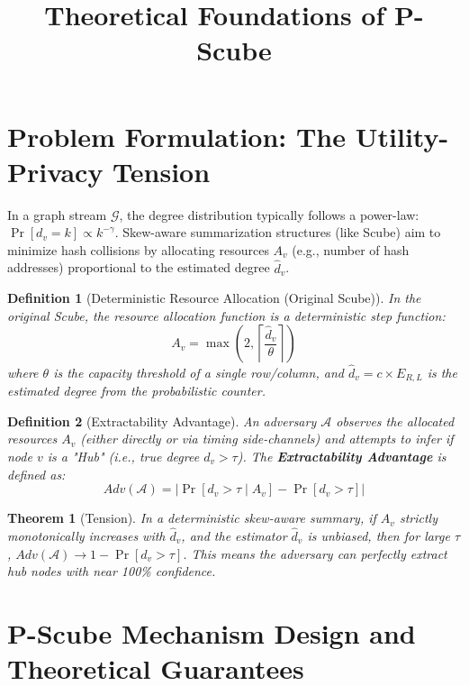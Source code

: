 \documentclass[11pt,a4paper]{article}
\title{Theoretical Foundations of P-Scube}
\author{}
\date{}
\newtheorem{definition}{Definition}
\newtheorem{theorem}{Theorem}
\begin{document}
\maketitle

\section{Problem Formulation: The Utility-Privacy Tension}

In a graph stream $\mathcal{G}$, the degree distribution typically follows a power-law: $\Pr[d_v = k] \propto k^{-\gamma}$. 
Skew-aware summarization structures (like Scube) aim to minimize hash collisions by allocating resources $A_v$ (e.g., number of hash addresses) proportional to the estimated degree $\hat{d}_v$.

\begin{definition}[Deterministic Resource Allocation (Original Scube)]
In the original Scube, the resource allocation function is a deterministic step function:
\begin{equation}
    A_v = \max\left(2, \left\lceil \frac{\hat{d}_v}{\theta} \right\rceil \right)
\end{equation}
where $\theta$ is the capacity threshold of a single row/column, and $\hat{d}_v = c \times E_{R,L}$ is the estimated degree from the probabilistic counter.
\end{definition}

\begin{definition}[Extractability Advantage]
An adversary $\mathcal{A}$ observes the allocated resources $A_v$ (either directly or via timing side-channels) and attempts to infer if node $v$ is a "Hub" (i.e., true degree $d_v > \tau$). 
The \textbf{Extractability Advantage} is defined as:
\begin{equation}
    Adv(\mathcal{A}) = \left| \Pr[d_v > \tau \mid A_v] - \Pr[d_v > \tau] \right|
\end{equation}
\end{definition}

\begin{theorem}[Tension]
In a deterministic skew-aware summary, if $A_v$ strictly monotonically increases with $\hat{d}_v$, and the estimator $\hat{d}_v$ is unbiased, then for large $\tau$, $Adv(\mathcal{A}) \to 1 - \Pr[d_v > \tau]$. This means the adversary can perfectly extract hub nodes with near 100\% confidence.
\end{theorem}

\section{P-Scube Mechanism Design and Theoretical Guarantees}
\end{document}
